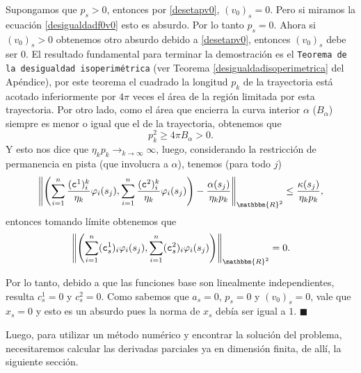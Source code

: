 \documentclass[a4paper,10pt]{book}
\newcommand{\R}{\mathbbm{R}}
\newenvironment{dem}{\vspace*{-0.1cm}{\it Demostraci\'on:}}{\hfill
$\blacksquare$\\}
\begin{document}
\begin{dem}
Supongamos que $p_s>0$, entonces por \eqref{desetapv0}, $(v_0)_s=0$. Pero si miramos la ecuación \eqref{desigualdadf0v0} esto es absurdo. Por lo tanto $p_s=0$. Ahora si $(v_0)_s>0$ obtenemos otro absurdo debido a \eqref{desetapv0}, entonces $(v_0)_s$ debe ser $0$. El resultado fundamental para terminar la demostración es el \texttt{Teorema de la desigualdad isoperimétrica} (ver Teorema \ref{desigualdadisoperimetrica} del Apéndice), por este teorema el cuadrado la longitud $p_k$ de la trayectoria está acotado inferiormente por $4\pi$ veces el área de la región limitada por esta trayectoria. Por otro lado, como el área que encierra la curva interior $\alpha$ ($B_\alpha$) siempre es menor o igual que el de la trayectoria, obtenemos que
\begin{equation*}
    p_k^2\geq 4\pi B_\alpha>0.
\end{equation*}
Y esto nos dice que $\displaystyle \eta_kp_k\mathop{\longrightarrow}_{k\to\infty}\infty$, luego, considerando la restricción de permanencia en pista (que involucra a $\alpha$), tenemos (para todo $j$)
\begin{equation*}
    \left\| \left(\sum_{i=1}^n\frac{(\texttt{c}^{1})^k_i}{\eta_k}\varphi_i(s_j), \sum_{i=1}^n\frac{(\texttt{c}^{2})^k_i}{\eta_k}\varphi_i(s_j)\right)-\frac{\alpha(s_j)}{\eta_kp_k} \right\|_{\R^2} \leq \frac{\kappa(s_j)}{\eta_kp_k},
\end{equation*}
entonces tomando límite obtenemos que
\[
 \left\|\left(\sum_{i=1}^n(\texttt{c}^1_s)_i\varphi_i(s_j), \sum_{i=1}^n(\texttt{c}^2_s)_i\varphi_i(s_j)\right)\right\|_{\R^2}=0.
\]


Por lo tanto, debido a que las funciones base son linealmente independientes, resulta $c^1_s=0$ y $c^2_s=0$. Como sabemos que $a_s=0$, $p_s=0$ y $(v_0)_s=0$, vale que $x_s=0$ y esto es un absurdo pues la norma de $x_s$ debía ser igual a $1$.
\end{dem}

Luego, para utilizar un método numérico y encontrar la solución del problema, necesitaremos calcular las derivadas parciales ya en dimensión finita, de allí, la siguiente sección.
\end{document}
